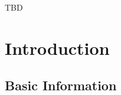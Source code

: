\documentclass[11pt,
  english,
  a4paper,
]{article}
\begin{document}
\leavevmode\tagmcend\tagstructend


TBD

\leavevmode\tagmcend\tagstructend\par

\pagebreak
\setlength{\parskip}{5mm plus1mm minus1mm}
\setcounter{page}{1}
\renewcommand{\thefigure}{\arabic{figure}}
\renewcommand{\thetable}{\arabic{table}}
\setcounter{table}{0}
\setcounter{figure}{0}

\setlength\parskip{0.5em plus 0.1em minus 0.2em}


\hypertarget{introduction}{%
\section{Introduction}\label{introduction}}

\leavevmode\tagmcend\tagstructend


\hypertarget{basic-information}{%
\subsection{Basic Information}\label{basic-information}}

\leavevmode\tagmcend\tagstructend

\end{document}
